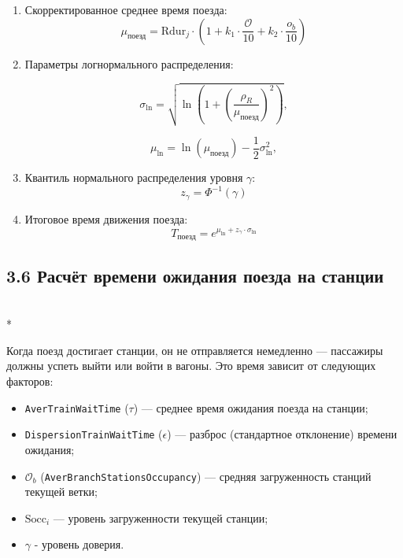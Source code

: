 \documentclass[12pt]{article}
\begin{document}
\begin{enumerate}
\item Скорректированное среднее время поезда:
  \begin{equation}
    \mu_{\text{поезд}} = \text{Rdur}_j \cdot \left(1 + k_1 \cdot \frac{\mathcal{O}}{10} + k_2 \cdot \frac{o_b}{10} \right)
  \end{equation}

\item Параметры логнормального распределения:

  \begin{equation}
    \sigma_{\ln} = \sqrt{\ln\left(1 + \left(\frac{\rho_R}{\mu_{\text{поезд}}} \right)^2\right)},
  \end{equation}

  \begin{equation}
    \mu_{\ln} = \ln(\mu_{\text{поезд}}) - \frac{1}{2} \sigma_{\ln}^2,
  \end{equation}

\item Квантиль нормального распределения уровня $\gamma$:
  \begin{equation}
    z_\gamma = \Phi^{-1}(\gamma)
  \end{equation}

\item Итоговое время движения поезда:
  \begin{equation}
    T_{\text{поезд}} = e^{\mu_{\ln} + z_\gamma \cdot \sigma_{\ln}}
  \end{equation}

\end{enumerate}

\subsection*{3.6 Расчёт времени ожидания поезда на станции}\mbox{}\\*

Когда поезд достигает станции, он не отправляется немедленно —
пассажиры должны успеть выйти или войти в вагоны.
Это время зависит от следующих факторов:

\begin{itemize}
  \item \texttt{AverTrainWaitTime} ($\tau$) — среднее время ожидания поезда на станции;
  \item \texttt{DispersionTrainWaitTime} ($\epsilon$) — разброс (стандартное отклонение) времени ожидания;
  \item $\mathcal{O}_b$ (\texttt{AverBranchStationsOccupancy}) — средняя загруженность станций текущей ветки;
  \item $\text{Socc}_i$ — уровень загруженности текущей станции;
  \item $\gamma$ - уровень доверия.
\end{itemize}
\end{document}
